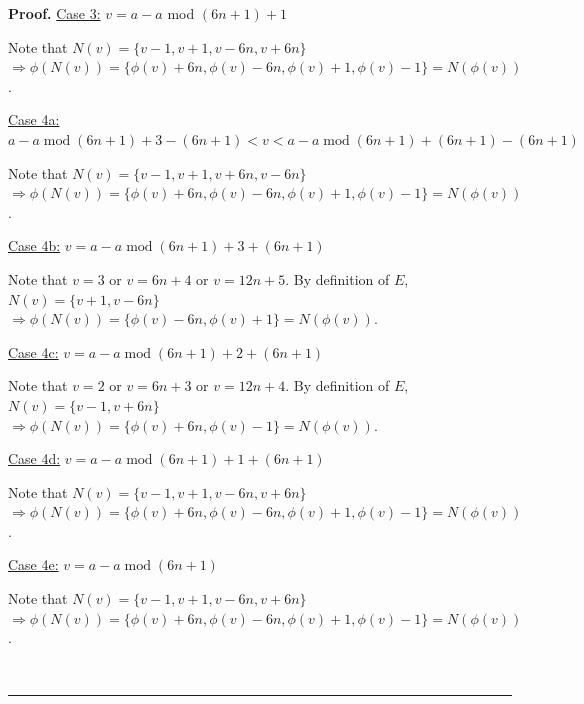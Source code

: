 \documentclass{article}%
\newenvironment{proof}[1][Proof]{\textbf{#1.} }{\ \rule{0.5em}{0.5em}}
\begin{document}
\begin{proof}
\noindent\newline\underline{Case 3:} $v=a-a$ mod $(6n+1)+1$

\noindent\newline Note that $N(v)=\{v-1,v+1,v-6n,v+6n\}$ \noindent
\newline$\Rightarrow\phi(N(v))=\{\phi(v)+6n,\phi(v)-6n,\phi(v)+1,\phi
(v)-1\}=N(\phi(v))$.

\noindent\newline\underline{Case 4a:} $a-a\operatorname{mod}%
(6n+1)+3-(6n+1)<v<a-a\operatorname{mod}(6n+1)+(6n+1)-(6n+1)$

\noindent\newline Note that $N(v)=\{v-1,v+1,v+6n,v-6n\}$ \noindent
\newline$\Rightarrow\phi(N(v))=\{\phi(v)+6n,\phi(v)-6n,\phi(v)+1,\phi
(v)-1\}=N(\phi(v))$.

\noindent\newline\underline{Case 4b:} $v=a-a\operatorname{mod}(6n+1)+3+(6n+1)$

\noindent\newline Note that $v=3$ or $v=6n+4$ or $v=12n+5$. By definition of
$E$, \noindent\newline$N(v)=\{v+1,v-6n\}$ \noindent\newline$\Rightarrow
\phi(N(v))=\{\phi(v)-6n,\phi(v)+1\}=N(\phi(v))$.

\noindent\newline\underline{Case 4c:} $v=a-a\operatorname{mod}(6n+1)+2+(6n+1)$

\noindent\newline Note that $v=2$ or $v=6n+3$ or $v=12n+4$. By definition of
$E$, \noindent\newline$N(v)=\{v-1,v+6n\}$ \noindent\newline$\Rightarrow
\phi(N(v))=\{\phi(v)+6n,\phi(v)-1\}=N(\phi(v))$.

\noindent\newline\underline{Case 4d:} $v=a-a\operatorname{mod}(6n+1)+1+(6n+1)$

\noindent\newline Note that $N(v)=\{v-1,v+1,v-6n,v+6n\}$ \noindent
\newline$\Rightarrow\phi(N(v))=\{\phi(v)+6n,\phi(v)-6n,\phi(v)+1,\phi
(v)-1\}=N(\phi(v))$.

\noindent\newline\underline{Case 4e:} $v=a-a\operatorname{mod}(6n+1)$

\noindent\newline Note that $N(v)=\{v-1,v+1,v-6n,v+6n\}$ \noindent
\newline$\Rightarrow\phi(N(v))=\{\phi(v)+6n,\phi(v)-6n,\phi(v)+1,\phi
(v)-1\}=N(\phi(v))$.


\end{proof}
\end{document}

